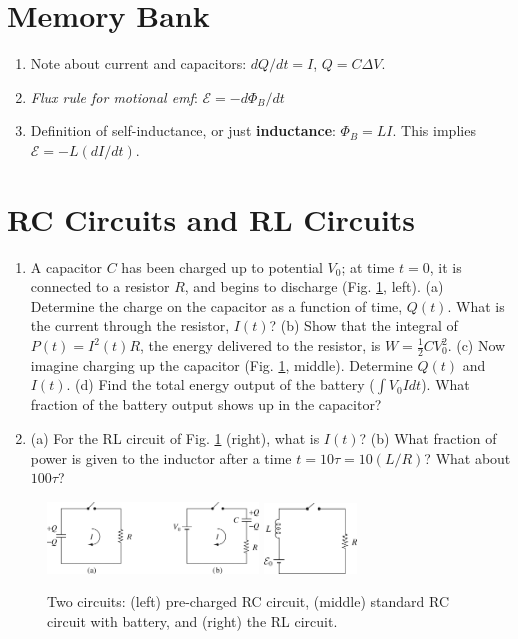 \documentclass[12pt]{article}
\begin{document}
\small
\maketitle
\section{Memory Bank}
\begin{enumerate}
\item Note about current and capacitors: $dQ/dt = I$, $Q = C\Delta V$.
\item \textit{Flux rule for motional emf}: $\mathcal{E} = - d\Phi_B/dt$
\item Definition of self-inductance, or just \textbf{inductance}: $\Phi_B = L I$.  This implies $\mathcal{E} = -L (dI/dt)$.
\end{enumerate}

\section{RC Circuits and RL Circuits}

\begin{enumerate}
\item A capacitor $C$ has been charged up to potential $V_0$; at time $t = 0$, it is connected to a resistor $R$, and begins to discharge (Fig. \ref{fig:1}, left). (a) Determine the charge on the capacitor as a function of time, $Q(t)$.  What is the current through the resistor, $I(t)$? (b) Show that the integral of $P(t) = I^2(t)R$, the energy delivered to the resistor, is $W = \frac{1}{2}CV_0^2$. (c) Now imagine charging up the capacitor (Fig. \ref{fig:1}, middle).  Determine $Q(t)$ and $I(t)$. (d) Find the total energy output of the battery ($\int V_0 I dt$).  What fraction of the battery output shows up in the capacitor? \\ \vspace{2cm}
\item (a) For the RL circuit of Fig. \ref{fig:1} (right), what is $I(t)$? (b) What fraction of power is given to the inductor after a time $t = 10\tau = 10(L/R)$? What about $100\tau$?
\end{enumerate}

\begin{figure}
\centering
\includegraphics[width=0.5\textwidth]{figures/7_5.jpg} \hspace{1cm}
\includegraphics[width=0.22\textwidth]{figures/7_35.jpg}
\caption{\label{fig:1} Two circuits: (left) pre-charged RC circuit, (middle) standard RC circuit with battery, and (right) the RL circuit.}
\end{figure}
\end{document}
